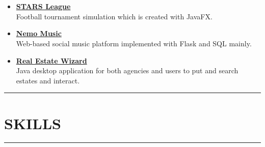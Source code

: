 \documentclass[11 pt, a4paper, usenames, dvipsnames]{article}
\newcommand*{\SectionFont}{%
      \fontsize{16}{5}%
\color{BrickRed}%
\bf
      \selectfont}
\begin{document}
\begin{paracol}{2}
\begin{itemize}[leftmargin=0pt,align=left,labelwidth=\parindent,labelsep=0pt]
\item[] \href{https://github.com/KeremAyoz/STARS-League}{\textbf{STARS League}} \verb||\faGithub \\ 
Football tournament simulation which is created with JavaFX.

\item[] \href{https://github.com/KeremAyoz/Nemo}{\textbf{Nemo Music}} \verb||\faGithub \\ 
Web-based social music platform implemented with Flask and SQL mainly.

\item[] \href{https://github.com/KeremAyoz/RealEstateWizard}{\textbf{Real Estate Wizard}} \verb||\faGithub \\ 
Java desktop application for both agencies and users to put and search estates and interact.

\end{itemize}

\par\noindent\rule{0.15\textwidth}{0.4pt}\vspace{-12pt}
\section*{\SectionFont\faStar\enskip SKILLS}\vspace{-15pt}
\par\noindent\rule{0.15\textwidth}{0.4pt} \\ \\
\mybox{\color{White}{C++}} \enskip
{} \enskip
{} \enskip
{} \enskip
{}\vspace{0.35em} \\
\mybox{\color{White}{SQL}}  \enskip
{} \enskip
{} \enskip
{} \enskip
{}\vspace{0.35em} \\ 
 \enskip
{} \enskip
\mybox{\color{White}\LaTeX} \vspace{0.35em} \\ 
 \enskip
{} \vspace{-0.85em} \\
 \enskip
{}\vspace{0.35em} \\
 \enskip
{}

\end{paracol}
\end{document}
